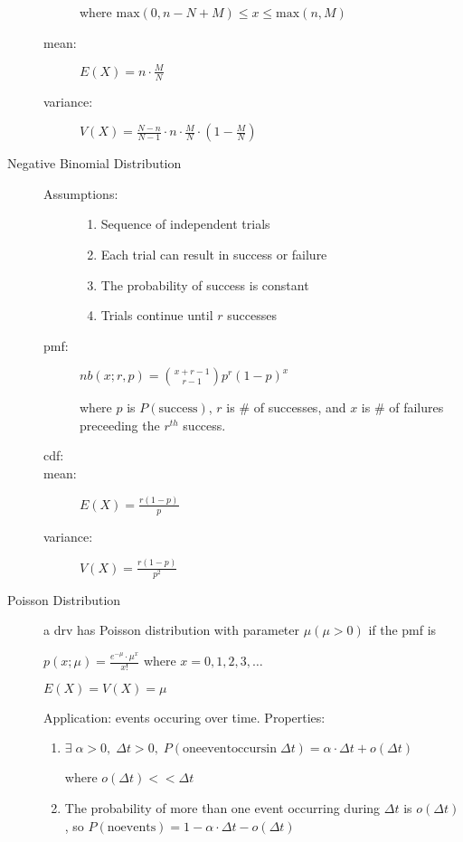 \documentclass[12pt]{letter}
\begin{document}
\begin{multicols}{2}
\begin{description}
\begin{description}
      where $\mathrm{max}(0, n-N+M) \leq x \leq \mathrm{max}(n,M)$
    \item[mean:] $E(X) = n \cdot \frac{M}{N}$
    \item[variance:] $V(X) = \frac{N-n}{N-1} \cdot n \cdot \frac{M}{N} \cdot \left( 1 - \frac{M}{N}\right)$
    \end{description}

  \item[Negative Binomial Distribution]
    \begin{description}
    \item[Assumptions:]
      \begin{enumerate}
      \item Sequence of independent trials
      \item Each trial can result in success or failure
      \item The probability of success is constant
      \item Trials continue until $r$ successes
      \end{enumerate}
    \item[pmf:] $nb(x; r, p) = {x + r - 1 \choose r-1} p^r(1-p)^x$

      where $p$ is $P(\mathrm{success})$, $r$ is \# of successes, and $x$ is \# of failures preceeding the $r^\mathit{th}$ success.
    \item[cdf:]
    \item[mean:] $E(X) = \frac{r(1-p)}{p}$
    \item[variance:] $V(X) = \frac{r(1-p)}{p^2}$
    \end{description}
    \pagebreak
  \item[Poisson Distribution]
    a drv has Poisson distribution with parameter $\mu (\mu > 0)$ if the pmf is

    $p(x; \mu) = \frac{e^{-\mu}\cdot \mu^x}{x!}$ where $x = 0,1,2,3,\ldots$

    $E(X) = V(X) = \mu$
    
    Application: events occuring over time. Properties:
    
    \begin{enumerate}
    \item $\exists\;\alpha > 0,\;\Delta t > 0,\; P(\mathrm{one event occurs in}\;\Delta t) = \alpha \cdot \Delta t + o(\Delta t)$

      where $o(\Delta t) << \Delta t$

    \item The probability of more than one event occurring during $\Delta t$ is $o(\Delta t)$, 
      so $P(\mathrm{no events}) = 1 - \alpha \cdot \Delta t - o(\Delta t)$


\end{enumerate}
\end{description}
\end{multicols}
\end{document}

